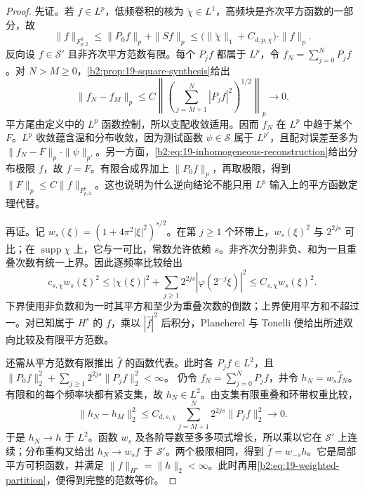 \begin{proof}
先证。若 \(f\in L^p\)，低频卷积的核为 \(\check\chi\in L^1\)，高频块是齐次平方函数的一部分，故
\[
 \|f\|_{F^0_{p,2}}
 \leq\|P_0f\|_p+\|Sf\|_p
 \leq\bigl(\|\check\chi\|_1+C_{d,p,\chi}\bigr)\cdot\|f\|_p.
\]
反向设 \(f\in\mathcal S'\) 且非齐次平方范数有限。每个 \(P_jf\) 都属于 \(L^p\)，令 \(f_N=\sum_{j=0}^NP_jf\)。对 \(N>M\geq0\)，\cref{b2:prop:19-square-synthesis}给出
\[
 \|f_N-f_M\|_p
 \leq C\left\|\left(\sum_{j=M+1}^N|P_jf|^2\right)^{1/2}\right\|_p
 \longrightarrow0.
\]
平方尾由定义中的 \(L^p\) 函数控制，所以支配收敛适用。因而 \(f_N\) 在 \(L^p\) 中趋于某个 \(F\)。\(L^p\) 收敛蕴含温和分布收敛，因为测试函数 \(\psi\in\mathcal S\) 属于 \(L^{p'}\)，且配对误差至多为 \(\|f_N-F\|_p\cdot\|\psi\|_{p'}\)。另一方面，\eqref{b2:eq:19-inhomogeneous-reconstruction}给出分布极限 \(f\)，故 \(f=F\)。有限合成界加上 \(\|P_0f\|_p\)，再取极限，得到 \(\|F\|_p\leq C\|f\|_{F^0_{p,2}}\)。这也说明为什么逆向结论不能只用 \(L^p\) 输入上的平方函数定理代替。

再证。记 \(w_s(\xi)=(1+4\pi^2|\xi|^2)^{s/2}\)。在第 \(j\geq1\) 个环带上，\(w_s(\xi)^2\) 与 \(2^{2js}\) 可比；在 \(\operatorname{supp}\chi\) 上，它与一可比，常数允许依赖 \(s\)。非齐次分割非负、和为一且重叠次数有统一上界。因此逐频率比较给出
\begin{equation}\label{b2:eq:19-weighted-partition}
 c_{s,\chi}w_s(\xi)^2
 \leq |\chi(\xi)|^2+
       \sum_{j\geq1}2^{2js}|\varphi(2^{-j}\xi)|^2
 \leq C_{s,\chi}w_s(\xi)^2.
\end{equation}
下界使用非负数和为一时其平方和至少为重叠次数的倒数；上界使用平方和不超过一。对已知属于 \(H^s\) 的 \(f\)，乘以 \(|\widehat f|^2\) 后积分，Plancherel 与 Tonelli 便给出所述双向比较及有限平方范数。

还需从平方范数有限推出 \(\widehat f\) 的函数代表。此时各 \(P_jf\in L^2\)，且
\(\|P_0f\|_2^2+\sum_{j\geq1}2^{2js}\|P_jf\|_2^2<\infty\)。
仍令 \(f_N=\sum_{j=0}^NP_jf\)，并令 \(h_N=w_s\widehat f_N\)。有限和的每个频率块都有紧支集，故 \(h_N\in L^2\)。由支集有限重叠和环带权重比较，
\[
 \|h_N-h_M\|_2^2
 \leq C_{d,s,\chi}\sum_{j=M+1}^N2^{2js}\|P_jf\|_2^2
 \longrightarrow0.
\]
于是 \(h_N\to h\) 于 \(L^2\)。函数 \(w_s\) 及各阶导数至多多项式增长，所以乘以它在 \(\mathcal S'\) 上连续；分布重构又给出 \(h_N\to w_s\widehat f\) 于 \(\mathcal S'\)。两个极限相同，得到 \(\widehat f=w_{-s}h\)。它是局部平方可积函数，并满足 \(\|f\|_{H^s}=\|h\|_2<\infty\)。此时再用\eqref{b2:eq:19-weighted-partition}，便得到完整的范数等价。
\end{proof}

